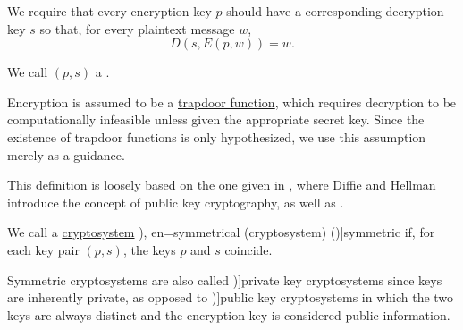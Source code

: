 \begin{definition}
\begin{thmenum}[series=def:cryptosystem]
     We require that every encryption key \( p \) should have a corresponding decryption key \( s \) so that, for every plaintext message \( w \),
    \begin{equation*}
      D(s, E(p, w)) = w.
    \end{equation*}

    We call \( (p, s) \) a .
  \end{thmenum}

  Encryption is assumed to be a \hyperref[def:trapdoor_function]{trapdoor function}, which requires decryption to be computationally infeasible unless given the appropriate secret key. Since the existence of trapdoor functions is only hypothesized, we use this assumption merely as a guidance.
\end{definition}
\begin{comments}
  \item This definition is loosely based on the one given in \cite[648]{DiffieHellman1976NewDirectionsInCryptography}, where Diffie and Hellman introduce the concept of public key cryptography, as well as .
\end{comments}

\begin{definition}\label{def:symmetric_cryptosystem}\mimprovised
  We call a \hyperref[def:cryptosystem]{cryptosystem} \term[ru=симметричная (шифрсистема) (\cite[52]{АлферовИПр2002ОсновыКриптографии}), en=symmetrical (cryptosystem) (\cite[88]{Koblitz1994NumberTheoryAndCryptography})]{symmetric} if, for each key pair \( (p, s) \), the keys \( p \) and \( s \) coincide.

  Symmetric cryptosystems are also called \term[en=private key cryptosystem (\cite[88]{Koblitz1994NumberTheoryAndCryptography})]{private key cryptosystems} since keys are inherently private, as opposed to \term[en=public key cryptosystem (\cite[88]{Koblitz1994NumberTheoryAndCryptography})]{public key cryptosystems} in which the two keys are always distinct and the encryption key is considered public information.
\end{definition}

